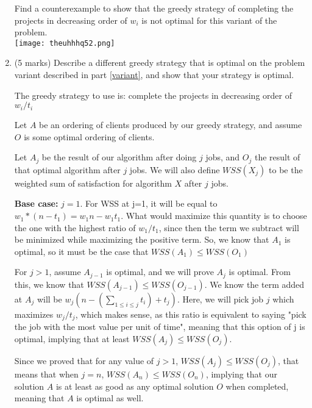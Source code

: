 \documentclass[11pt]{article}
\begin{document}
\begin{enumerate}
Find a counterexample to show that the greedy strategy of
completing the projects in decreasing order of $w_i$ is not
optimal for this variant of the problem.\\
\texttt{[image: theuhhhq52.png]}
  \item (5 marks)
    Describe a different greedy strategy that is optimal
    on the problem variant described in part \ref{variant}, and show
    that your strategy is optimal.
    
    \begin{soln}
    The greedy strategy to use is: complete the projects in decreasing order of $w_i/t_i$
    
    Let $A$ be an ordering of clients produced by our greedy strategy, and assume $O$ is some optimal ordering of clients.
    
    Let $A_j$ be the result of our algorithm after doing $j$ jobs, and $O_j$ the result of that optimal algorithm after $j$ jobs. We will also define $WSS(X_j)$ to be the weighted sum of satisfaction for algorithm $X$ after $j$ jobs. 
    
    \textbf{Base case:} $j=1$. For WSS at j=1, it will be equal to $w_1*(n-t_1) = w_1 n - w_1 t_1$. What would maximize this quantity is to choose the one with the highest ratio of $w_1/t_1$, since then the term we subtract will be minimized while maximizing the positive term. So, we know that $A_1$ is optimal, so it must be the case that $WSS(A_1) \leq WSS(O_1)$
    
    For $j>1$, assume $A_{j-1}$ is optimal, and we will prove $A_j$ is optimal. From this, we know that $WSS(A_{j-1}) \leq WSS(O_{j-1})$. We know the term added at $A_j$ will be $w_j (n - (\sum_{1 \le i \le j} t_i) + t_j)$. Here, we will pick job $j$ which maximizes $w_j/t_j$, which makes sense, as this ratio is equivalent to saying "pick the job with the most value per unit of time", meaning that this option of j is optimal, implying that at least $WSS(A_{j}) \leq WSS(O_{j})$.
    
    Since we proved that for any value of $j>1$, $WSS(A_{j}) \leq WSS(O_{j})$, that means that when $j=n$, $WSS(A_{n}) \leq WSS(O_{n})$, implying that our solution $A$ is at least as good as any optimal solution $O$ when completed, meaning that $A$ is optimal as well.
    \end{soln}

 \end{enumerate}
\end{document}
